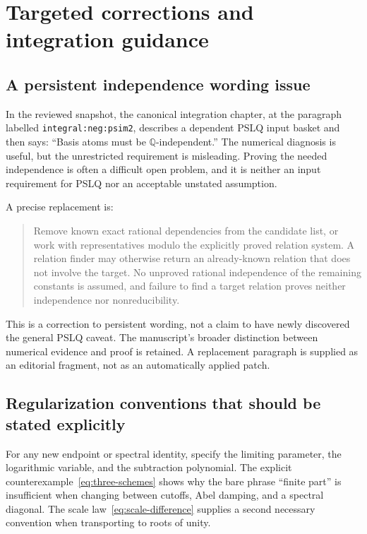 \documentclass[11pt,oneside]{article}
\numberwithin{equation}{section}
\theoremstyle{definition}
\theoremstyle{remark}
\newcommand{\Q}{\mathbb Q}
\newcommand{\src}[1]{\nolinkurl{#1}}
\begin{document}
\section{Targeted corrections and integration guidance}
\label{sec:audit}

\subsection{A persistent independence wording issue}

In the reviewed snapshot, the canonical integration chapter, at the paragraph
labelled \src{integral:neg:psim2}, describes a dependent PSLQ input basket and
then says: ``Basis atoms must be $\Q$-independent.'' The numerical diagnosis is
useful, but the unrestricted requirement is misleading. Proving the needed
independence is often a difficult open problem, and it is neither an input
requirement for PSLQ nor an acceptable unstated assumption.

A precise replacement is:
\begin{quote}
Remove known exact rational dependencies from the candidate list, or work
with representatives modulo the explicitly proved relation system. A
relation finder may otherwise return an already-known relation that does not
involve the target. No unproved rational independence of the remaining
constants is assumed, and failure to find a target relation proves neither
independence nor nonreducibility.
\end{quote}

This is a correction to persistent wording, not a claim to have newly
discovered the general PSLQ caveat. The manuscript's broader distinction
between numerical evidence and proof is retained. A replacement paragraph
is supplied as an editorial fragment, not as an automatically applied patch.

\subsection{Regularization conventions that should be stated explicitly}

For any new endpoint or spectral identity, specify the limiting parameter,
the logarithmic variable, and the subtraction polynomial. The explicit
counterexample~\eqref{eq:three-schemes} shows why the bare phrase ``finite
part'' is insufficient when changing between cutoffs, Abel damping, and a
spectral diagonal. The scale law~\eqref{eq:scale-difference} supplies a second
necessary convention when transporting to roots of unity.
\end{document}
